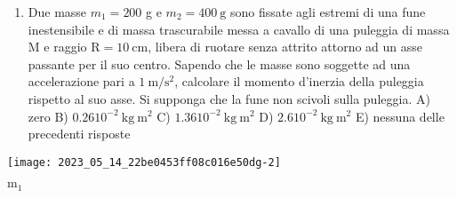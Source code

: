 \documentclass[10pt]{article}
\begin{document}
\begin{enumerate}
  \item Due masse \(m_{1}=200\) g e \(m_{2}=400 \mathrm{~g}\) sono fissate agli estremi di una fune inestensibile e di massa trascurabile messa a cavallo di una puleggia di massa \(\mathrm{M}\) e raggio \(\mathrm{R}=10 \mathrm{~cm}\), libera di ruotare senza attrito attorno ad un asse passante per il suo centro. Sapendo che le masse sono soggette ad una accelerazione pari a \(1 \mathrm{~m} / \mathrm{s}^{2}\), calcolare il momento d'inerzia della puleggia rispetto al suo asse. Si supponga che la fune non scivoli sulla puleggia.
A) zero
B) \(0.2610^{-2} \mathrm{~kg} \mathrm{~m}^{2}\)
C) \(1.3610^{-2} \mathrm{~kg} \mathrm{~m}^{2}\)
D) \(2.610^{-2} \mathrm{~kg} \mathrm{~m}^{2}\)
E) nessuna delle precedenti risposte

\end{enumerate}

\begin{center}
\texttt{[image: 2023\_05\_14\_22be0453ff08c016e50dg-2]}
\end{center}

\(\mathrm{m}_{1}\)
\end{document}
